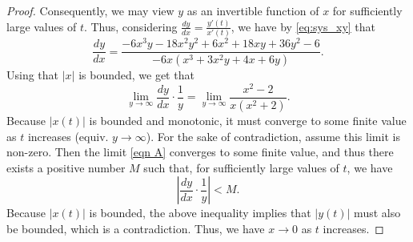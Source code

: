 \documentclass{amsart}
\numberwithin{equation}{section}
\theoremstyle{plain}
\theoremstyle{definition}
\theoremstyle{remark}
\numberwithin{table}{section}
\begin{document}
\begin{proof}
        Consequently, we may view $y$ as an invertible function of $x$ for sufficiently large values of $t$.
        Thus, considering $\frac{dy}{dx} = \frac{y'(t)}{x'(t)}$, we have by \eqref{eq:sys_xy} that 
        \[ 
            \frac{dy}{dx} = \frac{-6x^3 y - 18x^2 y^2 + 6x^2 + 18x y + 36y^2 - 6}{-6x\left(x^3 + 3x^2 y + 4x + 6y\right)}. 
        \]
        Using that $|x|$ is bounded, we get that
        \begin{equation}\label{eqn A}
             \lim_{y \to \infty}\frac{dy}{dx} \cdot \frac{1}{y} = \lim_{y \to \infty}\frac{x^2-2}{x\left(x^2+2\right)}. 
        \end{equation}
        Because $|x(t)|$ is bounded and monotonic, it must converge to some finite value as $t$ increases (equiv. $y\to \infty$).
        For the sake of contradiction, assume this limit is non-zero.
        Then the limit \eqref{eqn A} converges to some finite value, and thus there exists a positive number $M$ such that, for sufficiently large values of $t$, we have
        \[
            \left | \frac{dy}{dx} \cdot \frac{1}{y} \right | < M.
        \]
        Because $|x(t)|$ is bounded, the above inequality implies that $|y(t)|$ must also be bounded, which is a contradiction.
        Thus, we have $x\to 0$ as $t$ increases.

\end{proof}
\end{document}
